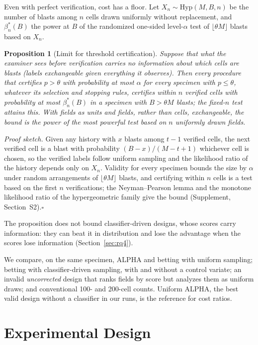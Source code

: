 \documentclass[journal]{IEEEtran}
\newtheorem{proposition}{Proposition}
\begin{document}
Even with perfect verification, cost has a floor. Let $X_n\sim\mathrm{Hyp}(M,B,n)$ be the number of blasts among $n$ cells drawn uniformly without replacement, and $\beta^*_n(B)$ the power at $B$ of the randomized one-sided level-$\alpha$ test of $\lfloor\theta M\rfloor$ blasts based on $X_n$.
\begin{proposition}[Limit for threshold certification]\label{prop:limit}
Suppose that what the examiner sees before verification carries no information about which cells are blasts (labels exchangeable given everything it observes). Then every procedure that certifies $p>\theta$ with probability at most $\alpha$ for every specimen with $p\le\theta$, whatever its selection and stopping rules, certifies within $n$ verified cells with probability at most $\beta^*_n(B)$ in a specimen with $B>\theta M$ blasts; the fixed-$n$ test attains this. With fields as units and fields, rather than cells, exchangeable, the bound is the power of the most powerful test based on $n$ uniformly drawn fields.
\end{proposition}
\emph{Proof sketch.} Given any history with $x$ blasts among $t-1$ verified cells, the next verified cell is a blast with probability $(B-x)/(M-t+1)$ whichever cell is chosen, so the verified labels follow uniform sampling and the likelihood ratio of the history depends only on $X_n$. Validity for every specimen bounds the size by $\alpha$ under random arrangements of $\lfloor\theta M\rfloor$ blasts, and certifying within $n$ cells is a test based on the first $n$ verifications; the Neyman--Pearson lemma and the monotone likelihood ratio of the hypergeometric family \cite{lehmann2005tsh} give the bound (Supplement, Section~S2).\hfill$\square$

The proposition does not bound classifier-driven designs, whose scores carry information: they can beat it in distribution and lose the advantage when the scores lose information (Section~\ref{sec:rq4}).

We compare, on the same specimen, ALPHA and betting with uniform sampling; betting with classifier-driven sampling, with and without a control variate; an invalid \emph{uncorrected} design that ranks fields by score but analyzes them as uniform draws; and conventional 100- and 200-cell counts. Uniform ALPHA, the best valid design without a classifier in our runs, is the reference for cost ratios.

\section{Experimental Design}
\end{document}
